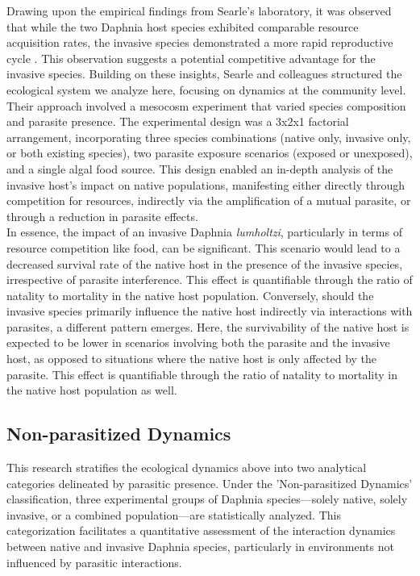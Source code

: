 \documentclass[12pt]{article}
\begin{document}
Drawing upon the empirical findings from Searle's laboratory, it was observed that while the two Daphnia host species exhibited comparable resource acquisition rates, the invasive species demonstrated a more rapid reproductive cycle \citep{Searle2016}. This observation suggests a potential competitive advantage for the invasive species. Building on these insights, Searle and colleagues structured the ecological system we analyze here, focusing on dynamics at the community level. Their approach involved a mesocosm experiment that varied species composition and parasite presence. The experimental design was a 3x2x1 factorial arrangement, incorporating three species combinations (native only, invasive only, or both existing species), two parasite exposure scenarios (exposed or unexposed), and a single algal food source. This design enabled an in-depth analysis of the invasive host's impact on native populations, manifesting either directly through competition for resources, indirectly via the amplification of a mutual parasite, or through a reduction in parasite effects.\\

In essence, the impact of an invasive Daphnia \textit{lumholtzi}, particularly in terms of resource competition like food, can be significant. This scenario would lead to a decreased survival rate of the native host in the presence of the invasive species, irrespective of parasite interference. This effect is quantifiable through the ratio of natality to mortality in the native host population. Conversely, should the invasive species primarily influence the native host indirectly via interactions with parasites, a different pattern emerges. Here, the survivability of the native host is expected to be lower in scenarios involving both the parasite and the invasive host, as opposed to situations where the native host is only affected by the parasite. This effect is quantifiable through the ratio of natality to mortality in the native host population as well.\\

\subsection{Non-parasitized Dynamics}
This research stratifies the ecological dynamics above into two analytical categories delineated by parasitic presence. Under the 'Non-parasitized Dynamics' classification, three experimental groups of Daphnia species—solely native, solely invasive, or a combined population—are statistically analyzed. This categorization facilitates a quantitative assessment of the interaction dynamics between native and invasive Daphnia species, particularly in environments not influenced by parasitic interactions.\\
\end{document}
